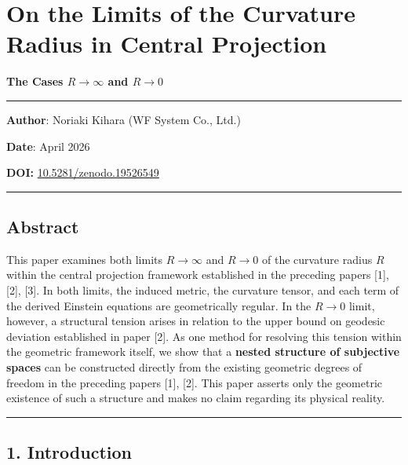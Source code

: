 \documentclass[a4paper,11pt]{article}
\theoremstyle{definition}
\begin{document}
\section{On the Limits of the Curvature Radius in Central Projection}\label{on-the-limits-of-the-curvature-radius-in-central-projection}

\textbf{The Cases \(R \to \infty\) and \(R \to 0\)}

\begin{center}\rule{0.5\linewidth}{0.5pt}\end{center}

\textbf{Author}: Noriaki Kihara (WF System Co., Ltd.)

\textbf{Date}: April 2026

\textbf{DOI:} \href{https://doi.org/10.5281/zenodo.19526549}{10.5281/zenodo.19526549}

\begin{center}\rule{0.5\linewidth}{0.5pt}\end{center}

\subsection{Abstract}\label{abstract}

This paper examines both limits \(R \to \infty\) and \(R \to 0\) of the curvature radius \(R\) within the central projection framework established in the preceding papers {[}1{]}, {[}2{]}, {[}3{]}. In both limits, the induced metric, the curvature tensor, and each term of the derived Einstein equations are geometrically regular. In the \(R \to 0\) limit, however, a structural tension arises in relation to the upper bound on geodesic deviation established in paper {[}2{]}. As one method for resolving this tension within the geometric framework itself, we show that a \textbf{nested structure of subjective spaces} can be constructed directly from the existing geometric degrees of freedom in the preceding papers {[}1{]}, {[}2{]}. This paper asserts only the geometric existence of such a structure and makes no claim regarding its physical reality.

\begin{center}\rule{0.5\linewidth}{0.5pt}\end{center}

\subsection{1. Introduction}\label{introduction}
\end{document}

